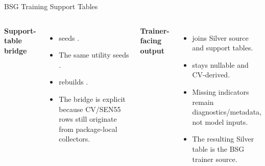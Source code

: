 \documentclass[aspectratio=169]{beamer}
\begin{document}
\begin{frame}[shrink=4]{BSG Training Support Tables}
\begin{columns}[T,onlytextwidth]
\textbf{Support-table bridge}
\begin{itemize}
  \item {} seeds .
  \item The same utility seeds .
  \item {} rebuilds .
  \item The bridge is explicit because CV/SEN55 rows still originate from package-local collectors.
\end{itemize}

\textbf{Trainer-facing output}
\begin{itemize}
  \item {} joins Silver source and support tables.
  \item {} stays nullable and CV-derived.
  \item Missing indicators remain diagnostics/metadata, not model inputs.
  \item The resulting Silver table is the BSG trainer source.
\end{itemize}
\end{columns}
\tightsep
\begin{center}
\hspace{0.45em}
\hspace{0.45em}
\hspace{0.45em}
\end{center}
\end{frame}
\end{document}
